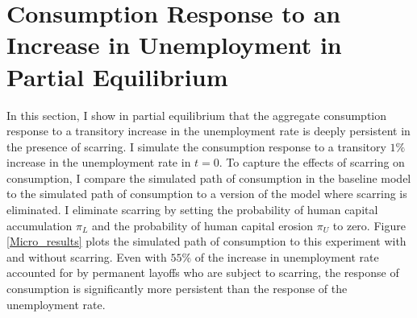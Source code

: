 
\section{Consumption Response to an Increase in Unemployment in Partial Equilibrium}

In this section, I show in partial equilibrium that the aggregate consumption response to a transitory increase in the unemployment rate is deeply persistent in the presence of scarring. I simulate the consumption response to a transitory $1\%$ increase in the unemployment rate in $t=0$. To capture the effects of scarring on consumption, I compare the simulated path of consumption in the baseline model to the simulated path of consumption to a version of the model where scarring is eliminated. I eliminate scarring by setting the probability of human capital accumulation $\pi_{L}$ and the probability of human capital erosion $\pi_{U}$ to zero. Figure \ref{Micro_results} plots the simulated path of consumption to this experiment with and without scarring. Even with $55\%$ of the increase in unemployment rate accounted for by permanent layoffs who are subject to scarring, the response of consumption is significantly more persistent than the response of the unemployment rate. 



